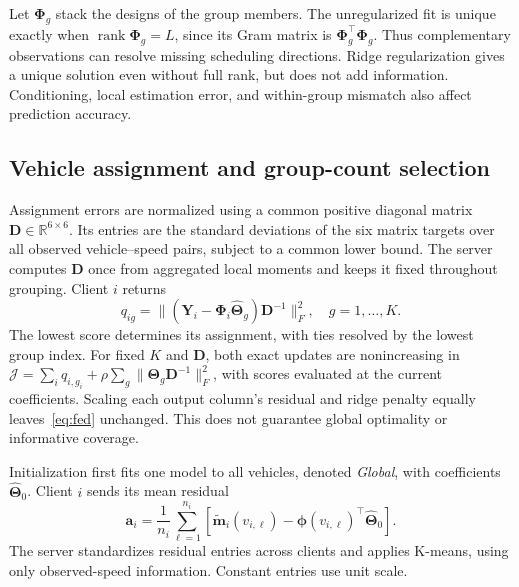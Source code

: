 \documentclass[conference]{IEEEtran}
\newcommand{\R}{\mathbb{R}}
\newcommand{\rank}{\operatorname{rank}}
\newcommand{\rev}[1]{\textcolor{revisiongreen}{#1}}
\newcommand{\focusrev}[1]{\textcolor{focusedrevision}{#1}}
\newcommand{\bs}[1]{\boldsymbol{#1}}
\newcommand{\method}[1]{\textit{#1}}
\newcommand{\GlobalModel}{\method{Global}}
\begin{document}
\rev{Let $\bs{\Phi}_g$ stack} the \rev{designs of the} group \rev{members}. The unregularized
fit \rev{is} unique \rev{exactly when} $\rank\bs{\Phi}_g=L$, \rev{since its} Gram matrix
is $\bs{\Phi}_g^\top\bs{\Phi}_g$. \rev{Thus complementary observations} can
resolve missing scheduling directions. \rev{Ridge regularization gives a unique
solution even without full rank, but does not add information. Conditioning,
local estimation} error, and \rev{within-group} mismatch also affect prediction accuracy.

\subsection{\rev{Vehicle assignment} and \rev{group-count} selection}
\focusrev{Assignment errors are normalized using a common positive diagonal
matrix $\bs{D}\in\R^{6\times6}$. Its entries are the standard deviations
of the six matrix targets over all observed vehicle--speed pairs, subject
to a common lower bound. The server computes $\bs{D}$ once from aggregated
local moments and keeps it fixed throughout grouping. Client $i$ returns}
\begingroup\color{revisiongreen}
\begin{equation}
 q_{ig}=\|(\bs{Y}_i-\bs{\Phi}_i\widehat{\bs{\Theta}}_g)
             \bs{D}^{-1}\|_F^2,\quad g=1,\ldots,K.
 \label{eq:score}
\end{equation}
\endgroup
\rev{The lowest score determines its assignment}, with ties \rev{resolved by} the
lowest \rev{group} index. \focusrev{For fixed $K$ and $\bs{D}$, both exact updates
are nonincreasing in $\mathcal J=\sum_i q_{i,g_i}
+\rho\sum_g\|\bs{\Theta}_g\bs{D}^{-1}\|_F^2$, with scores evaluated
at the current coefficients. Scaling each output column's residual and
ridge penalty equally leaves~\eqref{eq:fed} unchanged. This does not
guarantee global optimality or informative coverage.}

\rev{Initialization first fits} one \rev{model to} all vehicles, \rev{denoted} \GlobalModel{},
\rev{with coefficients $\widehat{\bs{\Theta}}_0$}. Client $i$ sends its mean residual
\begingroup\color{revisiongreen}
\begin{equation}
 \bs{a}_i=\frac{1}{n_i}\sum_{\ell=1}^{n_i}
 \left[\widetilde{\bs{m}}_i(v_{i,\ell})-
 \bs{\phi}(v_{i,\ell})^\top\widehat{\bs{\Theta}}_0\right].
 \label{eq:initial-summary}
\end{equation}
\endgroup
The server standardizes \rev{residual entries} across clients and applies K-means,
\rev{using only observed-speed information. Constant entries use unit scale}.
\end{document}
